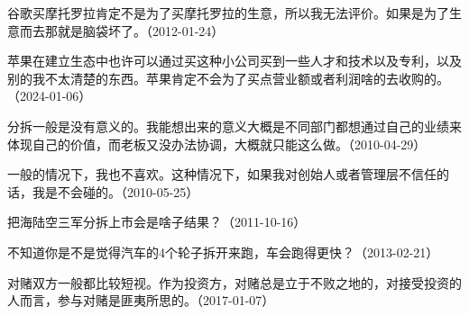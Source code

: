 谷歌买摩托罗拉肯定不是为了买摩托罗拉的生意，所以我无法评价。如果是为了生意而去那就是脑袋坏了。（2012-01-24）


苹果在建立生态中也许可以通过买这种小公司买到一些人才和技术以及专利，以及别的我不太清楚的东西。苹果肯定不会为了买点营业额或者利润啥的去收购的。（2024-01-06）


分拆一般是没有意义的。我能想出来的意义大概是不同部门都想通过自己的业绩来体现自己的价值，而老板又没办法协调，大概就只能这么做。（2010-04-29）


一般的情况下，我也不喜欢。这种情况下，如果我对创始人或者管理层不信任的话，我是不会碰的。（2010-05-25）


把海陆空三军分拆上市会是啥子结果？（2011-10-16）


不知道你是不是觉得汽车的4个轮子拆开来跑，车会跑得更快？（2013-02-21）


对赌双方一般都比较短视。作为投资方，对赌总是立于不败之地的，对接受投资的人而言，参与对赌是匪夷所思的。（2017-01-07）
